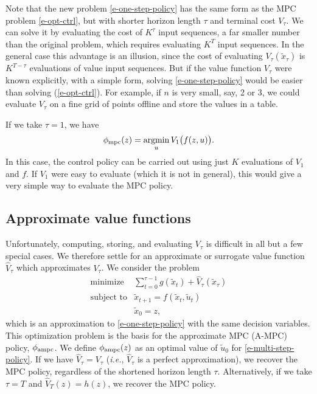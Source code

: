 \documentclass[12pt]{article}
\newcommand{\ie}{{\it i.e.}}
\newcommand{\argmin}{\mathop{\rm argmin}}
\begin{document}
Note that the new problem \eqref{e-one-step-policy}
has the same form as the MPC problem \eqref{e-opt-ctrl},
but with shorter horizon length $\tau$ and terminal cost $V_\tau$.
We can solve it by evaluating the cost of $K^\tau$ input sequences,
a far smaller number than the original problem, which requires evaluating
$K^T$ input sequences.
In the general case this advantage is an illusion, since 
the cost of evaluating $V_\tau(\tilde x_\tau)$ is $K^{T-\tau}$ 
evaluations of value input sequences.
But if the value function $V_\tau$ were known explicitly,
with a simple form, solving \eqref{e-one-step-policy}
would be easier than solving (\ref{e-opt-ctrl}).
For example, if $n$ is very small, say, 2 or 3, we could evaluate 
$V_\tau$ on a fine grid of points offline and store the values
in a table.


If we take $\tau=1$, we have
\begin{align*}
\phi_{\rm mpc}(z) = \argmin_{u} V_1 \big(f(z,u)\big).
\end{align*}
In this case, the control policy can be carried out 
using just $K$ evaluations of $V_1$ and $f$.
If $V_1$ were easy to evaluate (which it is not in general), this 
would give a very simple way to evaluate the MPC policy.



\subsection{Approximate value functions}
Unfortunately, computing, storing, and evaluating $V_\tau$
is difficult in all but a few special cases.
We therefore settle for an approximate or surrogate value 
function $\hat V_\tau$ which approximates $V_\tau$.
We consider the problem
\begin{equation}
\begin{array}{ll}
\mbox{minimize} & 
  \sum_{t=0}^{\tau-1} g(\tilde x_t) + \hat V_\tau (\tilde x_\tau) \\
\mbox{subject to} & \tilde x_{t+1} = f(\tilde x_t, \tilde u_t) \\
                  & \tilde x_0 = z,
\end{array}
\label{e-multi-step-policy}
\end{equation}
which is an approximation to \eqref{e-one-step-policy} 
with the same decision variables.
This optimization problem is the basis for the approximate MPC (A-MPC)
policy, $\phi_{\rm ampc}$.
We define $\phi_{\rm ampc}(z)$ as an optimal value of $\tilde u_0$
for \eqref{e-multi-step-policy}.
If we have $\hat V_\tau = V_\tau$
(\ie, $\hat V_\tau$ is a perfect approximation),
we recover the MPC policy,
regardless of the shortened horizon length $\tau$.
Alternatively, if we take $\tau=T$ and $\hat V_T(z) = h(z)$, 
we recover the MPC policy.
\end{document}
